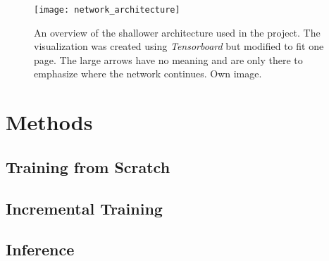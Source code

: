 \begin{figure}[!tbp]
\end{figure} 

\begin{figure}[!tbp]
	\centering
    \texttt{[image: network\_architecture]}
    \caption{An overview of the shallower architecture used in the project. The visualization was created using \textit{Tensorboard} but modified to fit one page. The large arrows have no meaning and are only there to emphasize where the network continues. Own image.}
    	\label{fig:network_architecture}
\end{figure}

\section{Methods}



\subsection{Training from Scratch}

\subsection{Incremental Training}

\subsection{Inference}


